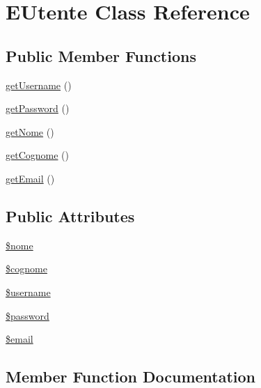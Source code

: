 \hypertarget{class_e_utente}{}\section{E\+Utente Class Reference}
\label{class_e_utente}
\subsection*{Public Member Functions}
\begin{DoxyCompactItemize}
\item 
\mbox{\hyperlink{class_e_utente_a56dfc3a0238906314a9f91307f5aebfe}{get\+Username}} ()
\item 
\mbox{\hyperlink{class_e_utente_a182d7665aec0803b5dbbdd0cc7b30f4d}{get\+Password}} ()
\item 
\mbox{\hyperlink{class_e_utente_a99ca081bec90946b4770c415218b41aa}{get\+Nome}} ()
\item 
\mbox{\hyperlink{class_e_utente_a4c83f19649fa9baae5e26b60ace3c5b3}{get\+Cognome}} ()
\item 
\mbox{\hyperlink{class_e_utente_a695e3ad33a21d12622147a98cd19a57c}{get\+Email}} ()
\end{DoxyCompactItemize}
\subsection*{Public Attributes}
\begin{DoxyCompactItemize}
\item 
\mbox{\hyperlink{class_e_utente_a574c332ff492722de84a5f7cf948cf91}{\$nome}}
\item 
\mbox{\hyperlink{class_e_utente_a7c5f0a90e28c69896b2c1c21cc851b57}{\$cognome}}
\item 
\mbox{\hyperlink{class_e_utente_a964ccb2ceed1d10cc7c86af98ffde56b}{\$username}}
\item 
\mbox{\hyperlink{class_e_utente_a794a78593cb9f61f83b873c240bc0841}{\$password}}
\item 
\mbox{\hyperlink{class_e_utente_a07095fee1565d7f793c1cf2b2e2fdb41}{\$email}}
\end{DoxyCompactItemize}


\subsection{Member Function Documentation}
\mbox{\label{class_e_utente_a4c83f19649fa9baae5e26b60ace3c5b3}} 

